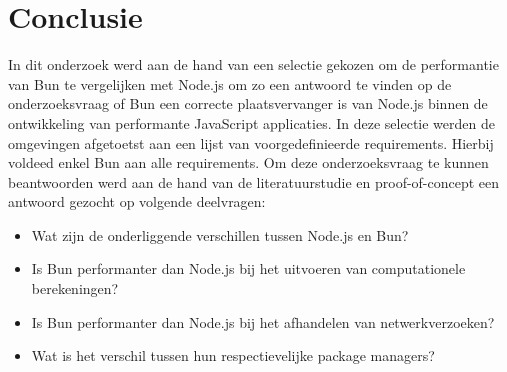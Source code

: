 
\chapter{Conclusie}%
\label{ch:conclusie}


In dit onderzoek werd aan de hand van een selectie gekozen om de performantie van Bun te vergelijken met Node.js om zo een antwoord te vinden op de 
onderzoeksvraag of Bun een correcte plaatsvervanger is van Node.js binnen de ontwikkeling van performante JavaScript applicaties.
In deze selectie werden de omgevingen afgetoetst aan een lijst van voorgedefinieerde requirements. Hierbij voldeed enkel Bun aan alle requirements.
Om deze onderzoeksvraag te kunnen beantwoorden werd aan de hand van de literatuurstudie en proof-of-concept een antwoord gezocht op volgende deelvragen:
\begin{itemize}
    \item Wat zijn de onderliggende verschillen tussen Node.js en Bun?
    \item Is Bun performanter dan Node.js bij het uitvoeren van computationele berekeningen?
    \item Is Bun performanter dan Node.js bij het afhandelen van netwerkverzoeken?
    \item Wat is het verschil tussen hun respectievelijke package managers?
  \end{itemize}

